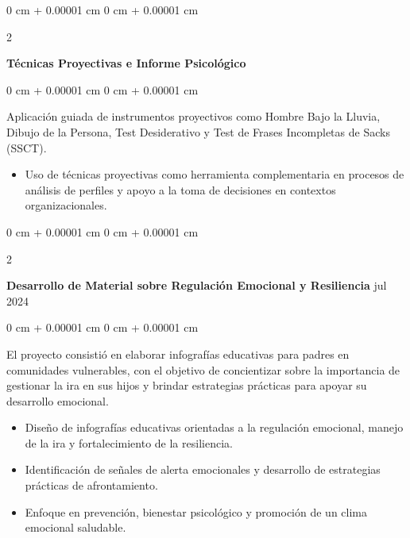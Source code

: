 \documentclass[10pt, letterpaper]{article}
\newenvironment{highlights}{
    \begin{itemize}[
        topsep=0.10 cm,
        parsep=0.10 cm,
        partopsep=0pt,
        itemsep=0pt,
        leftmargin=0 cm + 10pt
    ]
}{
    \end{itemize}
} %
\newenvironment{onecolentry}{
    \begin{adjustwidth}{
        0 cm + 0.00001 cm
    }{
        0 cm + 0.00001 cm
    }
}{
    \end{adjustwidth}
} %
\newenvironment{twocolentry}[2][]{
    \onecolentry
    \def\secondColumn{#2}
    \setcolumnwidth{\fill, 4.5 cm}
    \begin{paracol}{2}
}{
    \switchcolumn \raggedleft \secondColumn
    \end{paracol}
    \endonecolentry
} %
\begin{document}
        \vspace{0.2 cm}


        \begin{twocolentry}{
             2025
        }
            \textbf{Técnicas Proyectivas e Informe Psicológico}\end{twocolentry}

        \vspace{0.10 cm}
        \begin{onecolentry}
        Aplicación guiada de instrumentos proyectivos como Hombre Bajo la Lluvia, Dibujo de la Persona, Test Desiderativo y Test de Frases Incompletas de Sacks (SSCT).
            \begin{highlights}
                \item Uso de técnicas proyectivas como herramienta complementaria en procesos de análisis de perfiles y apoyo a la toma de decisiones en contextos organizacionales.
            \end{highlights}
        \end{onecolentry}

        \vspace{0.2 cm}

        \begin{twocolentry}{
            jul 2024
        }
            \textbf{Desarrollo de Material sobre Regulación Emocional y Resiliencia}\end{twocolentry}

        \vspace{0.10 cm}
        \begin{onecolentry}
        El proyecto consistió en elaborar infografías educativas para padres en comunidades vulnerables, con el objetivo de concientizar sobre la importancia de gestionar la ira en sus hijos y brindar estrategias prácticas para apoyar su desarrollo emocional.
            \begin{highlights}
                \item Diseño de infografías educativas orientadas a la regulación emocional, manejo de la ira y fortalecimiento de la resiliencia. 
                \item Identificación de señales de alerta emocionales y desarrollo de estrategias prácticas de afrontamiento.
                \item Enfoque en prevención, bienestar psicológico y promoción de un clima emocional saludable.
            \end{highlights}
        \end{onecolentry}
\end{document}
